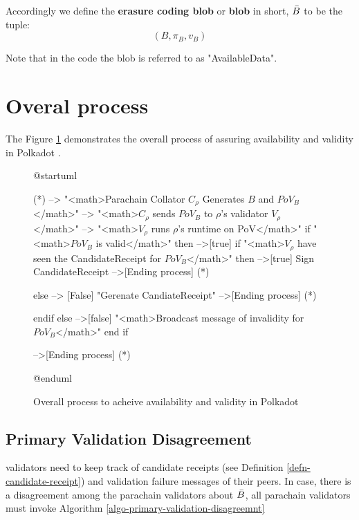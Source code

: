 \begin{definition}
  \label{defn-blob}
  Accordingly we define the {\bf erasure coding blob} or {\bf blob} in short,
  {\bf $\bar{B}$} to be the tuple:
  \[
  (B, \pi_B, v_B)
  \]
\end{definition}

Note that in the code the blob is referred to as "AvailableData".


\section{Overal process}

The Figure \ref{diag-anv-overall} demonstrates the overall process of assuring
availability and validity in Polkadot .

\begin{figure}[h!]
\label{diag-anv-overall}
\begin{plantuml}
@startuml

(*) --> "<math>Parachain Collator $C_\rho$ Generates  $B$ and $PoV_B$</math>"
    --> "<math>$C_\rho$ sends $PoV_B$ to $\rho$'s validator $V_\rho$</math>"
    --> "<math>$V_{\rho}$ runs $\rho$'s runtime on PoV</math>"
    if "<math>$PoV_B$ is valid</math>" then
    -->[true] if  "<math>$V_{\rho}$ have seen the CandidateReceipt for $PoV_B$</math>" then
    -->[true] Sign CandidateReceipt
    -->[Ending process] (*)

    else
    --> [False] "Gerenate CandiateReceipt"
    -->[Ending process] (*)

    endif
    else
    -->[false] "<math>Broadcast message of invalidity for $PoV_B$</math>"
    end if

  -->[Ending process] (*)

@enduml
\end{plantuml}
\caption{Overall process to acheive availability and validity in Polkadot}
\end{figure}



\subsection{Primary Validation Disagreement}
\label{sect-primary-validation-disagreemnt}
 validators need to keep track of candidate receipts
(see Definition \ref{defn-candidate-receipt}) and validation failure messages of
their peers. In case, there is a disagreement among the parachain validators
about $\bar{B}$, all parachain validators must invoke Algorithm
\ref{algo-primary-validation-disagreemnt}

